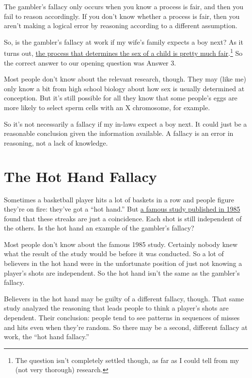 \documentclass[justified]{tufte-book}
\theoremstyle{definition}
\theoremstyle{definition}
\theoremstyle{definition}
\theoremstyle{definition}
\theoremstyle{remark}
\begin{document}
The gambler's fallacy only occurs when you know a process is fair, and then you fail to reason accordingly. If you don't know whether a process is fair, then you aren't making a logical error by reasoning according to a different assumption.

So, is the gambler's fallacy at work if my wife's family expects a boy next? As it turns out, \href{https://doi.org/10.1080/09332480.2001.10542293}{the process that determines the sex of a child is pretty much fair}.\footnote{The question isn't completely settled though, as far as I could tell from my (not very thorough) research.} So the correct answer to our opening question was Answer 3.

Most people don't know about the relevant research, though. They may (like me) only know a bit from high school biology about how sex is usually determined at conception. But it's still possible for all they know that some people's eggs are more likely to select sperm cells with an X chromosome, for example.

So it's not necessarily a fallacy if my in-laws expect a boy next. It could just be a reasonable conclusion given the information available. A fallacy is an error in reasoning, not a lack of knowledge.

\hypertarget{the-hot-hand-fallacy}{%
\section{The Hot Hand Fallacy}\label{the-hot-hand-fallacy}}

Sometimes a basketball player hits a lot of baskets in a row and people figure they're on fire: they've got a ``hot hand.'' But \href{http://www.sciencedirect.com/science/article/pii/0010028585900106?via\%3Dihub}{a famous study published in 1985} found that these streaks are just a coincidence. Each shot is still independent of the others. Is the hot hand an example of the gambler's fallacy?

Most people don't know about the famous 1985 study. Certainly nobody knew what the result of the study would be before it was conducted. So a lot of believers in the hot hand were in the unfortunate position of just not knowing a player's shots are independent. So the hot hand isn't the same as the gambler's fallacy.

Believers in the hot hand may be guilty of a different fallacy, though. That same study analyzed the reasoning that leads people to think a player's shots are dependent. Their conclusion: people tend to see patterns in sequences of misses and hits even when they're random. So there may be a second, different fallacy at work, the ``hot hand fallacy.''
\end{document}
